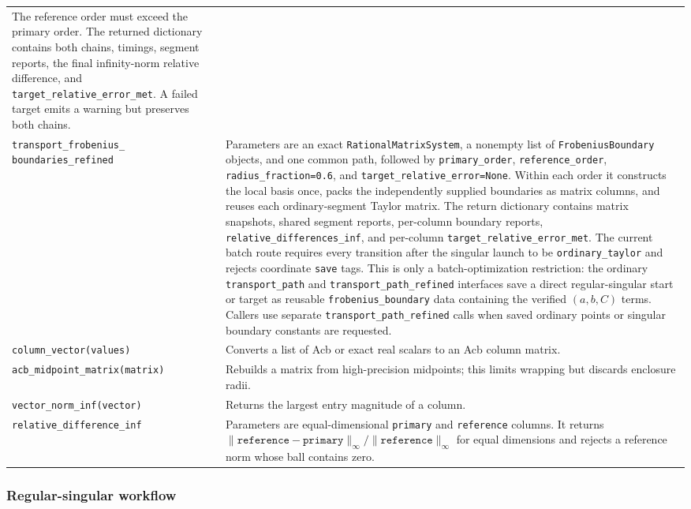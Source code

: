 \documentclass[11pt]{article}
\begin{document}
\begin{longtable}{L{0.36\textwidth}L{0.58\textwidth}}
The reference order must exceed the primary order.  The returned dictionary contains both
chains, timings, segment reports, the final infinity-norm relative difference, and
\texttt{target\_relative\_error\_met}.  A failed target emits a warning but preserves both chains. \\
\texttt{transport\_frobenius\_}\newline
\texttt{boundaries\_refined} & Parameters are an exact
\texttt{RationalMatrixSystem}, a nonempty list of \texttt{FrobeniusBoundary} objects, and
one common path, followed by \texttt{primary\_order}, \texttt{reference\_order},
\texttt{radius\_fraction=0.6}, and \texttt{target\_relative\_error=None}.  Within each
order it constructs the local basis once, packs the independently supplied boundaries as
matrix columns, and reuses each ordinary-segment Taylor matrix.  The return dictionary
contains matrix snapshots, shared segment reports, per-column boundary reports,
\texttt{relative\_differences\_inf}, and per-column
\texttt{target\_relative\_error\_met}.  The current batch route requires every transition
after the singular launch to be \texttt{ordinary\_taylor} and rejects coordinate
\texttt{save} tags.  This is only a batch-optimization restriction: the ordinary
\texttt{transport\_path} and \texttt{transport\_path\_refined} interfaces save a direct
regular-singular start or target as reusable \texttt{frobenius\_boundary} data containing
the verified $(a,b,C)$ terms.  Callers use separate \texttt{transport\_path\_refined}
calls when saved ordinary points or singular boundary constants are requested. \\
\texttt{column\_vector(values)} & Converts a list of Acb or exact real scalars to an Acb
column matrix. \\
\texttt{acb\_midpoint\_matrix(matrix)} & Rebuilds a matrix from high-precision midpoints;
this limits wrapping but discards enclosure radii. \\
\texttt{vector\_norm\_inf(vector)} & Returns the largest entry magnitude of a column. \\
\texttt{relative\_difference\_inf} & Parameters are equal-dimensional \texttt{primary} and
\texttt{reference} columns.  It returns
$\|\texttt{reference}-\texttt{primary}\|_\infty/\|\texttt{reference}\|_\infty$ for equal
dimensions and rejects a reference norm whose ball contains zero. \\
\bottomrule
\end{longtable}
\normalsize

\subsubsection{Regular-singular workflow}
\end{document}
